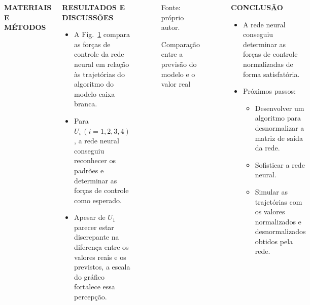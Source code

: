 \documentclass[serif,20pt]{beamer}
\begin{document}
\begin{frame}[t]
\begin{columns}[t]
\begin{block}{\centering\bfseries MATERIAIS E MÉTODOS}
\end{block}

\begin{block}{\centering\bfseries RESULTADOS E DISCUSSÕES}

\begin{itemize}
    \item A Fig.~\ref{fig:comparison} compara as forças de controle da rede neural em relação às trajetórias do algoritmo do modelo caixa branca.
    \item Para \(U_i\, (i=1,2,3,4)\), a rede neural conseguiu reconhecer os padrões e determinar as forças de controle como esperado.
    \item Apesar de \(U_1\) parecer estar discrepante na diferença entre os valores reais e os previstos, a escala do gráfico fortalece essa percepção.
\end{itemize}
\end{block}



\begin{block}{}

\begin{figure}[H]
    \centering
    \caption{Comparação entre a previsão do modelo e o valor real}

    {\footnotesize Fonte: próprio autor.}

    \label{fig:comparison}
\end{figure}
\end{block}

\begin{block}{\centering\bfseries CONCLUSÃO}

\begin{itemize}
    \item A rede neural conseguiu determinar as forças de controle normalizadas de forma satisfatória.
    \item Próximos passos:
    \begin{itemize}
        \item Desenvolver um algoritmo para desnormalizar a matriz de saída da rede.
        \item Sofisticar a rede neural.
        \item Simular as trajetórias com os valores normalizados e desnormalizados obtidos pela rede.
    \end{itemize}
\end{itemize}


\end{block}
\end{columns}
\end{frame}
\end{document}
